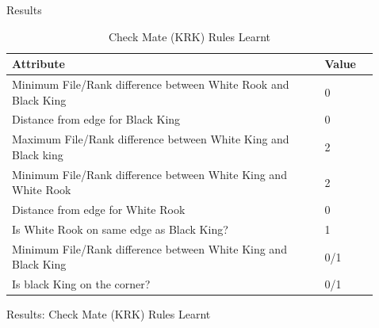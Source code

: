 \documentclass[final,hyperref={pdfpagelabels=false}]{beamer}
\begin{document}
\begin{frame}[t]
\begin{columns}[t]
\begin{column}{.465\textwidth}

\end{column} %

\begin{column}{.03\textwidth}\end{column} %
 
\begin{column}{.465\textwidth} %


\begin{block}{Results}

\begin{table}
\begin{tabular}{l l l}
\toprule
\textbf{Attribute} & \textbf{Value}\\
\midrule
Minimum File/Rank difference between White Rook and Black King &   0 \\
Distance from edge for Black King &  0 \\
Maximum File/Rank difference between White King and Black king &   2 \\
Minimum File/Rank difference between White King and White Rook &   2 \\ 
Distance from edge for White Rook & 0 \\
Is White Rook on same edge as Black King? & 1 \\
Minimum File/Rank difference between White King and Black King &   0/1 \\
Is black King on the corner? & 0/1 \\
\bottomrule
\end{tabular}
\caption{Check Mate (KRK) Rules Learnt}
\end{table}
     
\end{block}


\begin{block}{Results: Check Mate (KRK) Rules Learnt}


\end{block}
\end{column}
\end{columns}
\end{frame}
\end{document}
